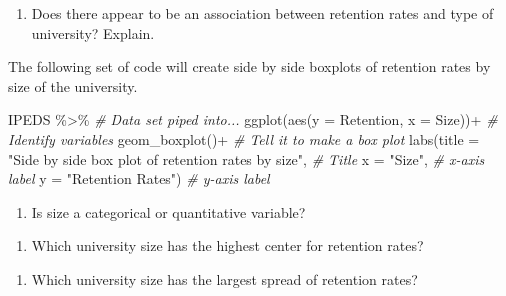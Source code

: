 \documentclass[
]{report}
\newenvironment{Shaded}{\begin{snugshade}}{\end{snugshade}}
\newcommand{\AttributeTok}[1]{\textcolor[rgb]{0.77,0.63,0.00}{#1}}
\newcommand{\CommentTok}[1]{\textcolor[rgb]{0.56,0.35,0.01}{\textit{#1}}}
\newcommand{\FunctionTok}[1]{\textcolor[rgb]{0.00,0.00,0.00}{#1}}
\newcommand{\NormalTok}[1]{#1}
\newcommand{\SpecialCharTok}[1]{\textcolor[rgb]{0.00,0.00,0.00}{#1}}
\newcommand{\StringTok}[1]{\textcolor[rgb]{0.31,0.60,0.02}{#1}}
\providecommand{\tightlist}{%
  \setlength{\itemsep}{0pt}\setlength{\parskip}{0pt}}
\begin{document}
\vspace{0.8in}

\begin{enumerate}
\def\labelenumi{\arabic{enumi}.}
\setcounter{enumi}{13}
\tightlist
\item
  Does there appear to be an association between retention rates and type of university? Explain.
\end{enumerate}

\vspace{0.8in}

The following set of code will create side by side boxplots of retention rates by size of the university.

\begin{Shaded}
\begin{Highlighting}[]
\NormalTok{IPEDS }\SpecialCharTok{\%\textgreater{}\%}  \CommentTok{\# Data set piped into...}
  \FunctionTok{ggplot}\NormalTok{(}\FunctionTok{aes}\NormalTok{(}\AttributeTok{y =}\NormalTok{ Retention, }\AttributeTok{x =}\NormalTok{ Size))}\SpecialCharTok{+}  \CommentTok{\# Identify variables}
  \FunctionTok{geom\_boxplot}\NormalTok{()}\SpecialCharTok{+}  \CommentTok{\# Tell it to make a box plot}
  \FunctionTok{labs}\NormalTok{(}\AttributeTok{title =} \StringTok{"Side by side box plot of retention rates by size"}\NormalTok{,  }\CommentTok{\# Title}
       \AttributeTok{x =} \StringTok{"Size"}\NormalTok{,    }\CommentTok{\# x{-}axis label}
       \AttributeTok{y =} \StringTok{"Retention Rates"}\NormalTok{)  }\CommentTok{\# y{-}axis label}
\end{Highlighting}
\end{Shaded}

\begin{enumerate}
\def\labelenumi{\arabic{enumi}.}
\setcounter{enumi}{14}
\tightlist
\item
  Is size a categorical or quantitative variable?
\end{enumerate}

\vspace{0.5in}

\begin{enumerate}
\def\labelenumi{\arabic{enumi}.}
\setcounter{enumi}{15}
\tightlist
\item
  Which university size has the highest center for retention rates?
\end{enumerate}

\vspace{0.5in}

\begin{enumerate}
\def\labelenumi{\arabic{enumi}.}
\setcounter{enumi}{16}
\tightlist
\item
  Which university size has the largest spread of retention rates?
\end{enumerate}
\end{document}
